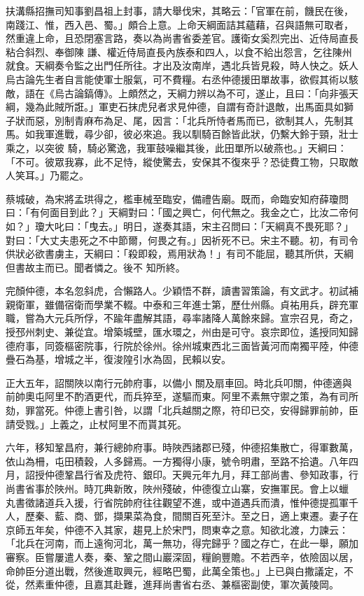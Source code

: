 \begin{pinyinscope}
 扶溝縣招撫司知事劉昌祖上封事，請大舉伐宋，其略云：「官軍在前，饑民在後，南踐江、惟，西入邑、蜀。」頗合上意。上命天綱面詰其蘊藉，召與語無可取者，然重違上命，且恐閉塞言路，奏以為尚書省委差官。護衛女奚烈完出、近侍局直長粘合斜烈、奉御陳
 謙、權近侍局直長內族泰和四人，以食不給出怨言，乞往陳州就食。天綱奏令監之出門任所往。才出及汝南岸，遇北兵皆見殺，時人快之。妖人烏古論先生者自言能使軍士服氣，可不費糧。右丞仲德援田單故事，欲假其術以駭敵，語在《烏古論鎬傳》。上頗然之，天綱力辨以為不可，遂止，且曰：「向非張天綱，幾為此賊所誑。」軍吏石抹虎兒者求見仲德，自謂有奇計退敵，出馬面具如獅子狀而惡，別制青麻布為足、尾，因言：「北兵所恃者馬而已，欲制其人，先制其馬。如我軍進戰，尋少卻，彼必來追。我以馴騎百餘皆此狀，仍繫大鈴于頸，壯士乘之，以突彼
 騎，騎必驚逸，我軍鼓噪繼其後，此田單所以破燕也。」天綱曰：「不可。彼眾我寡，此不足恃，縱使驚去，安保其不復來乎？恐徒費工物，只取敵人笑耳。」乃罷之。



 蔡城破，為宋將孟珙得之，檻車械至臨安，備禮告廟。既而，命臨安知府薛瓊問曰：「有何面目到此？」天綱對曰：「國之興亡，何代無之。我金之亡，比汝二帝何如？」瓊大叱曰：「曳去。」明日，遂奏其語，宋主召問曰：「天綱真不畏死耶？」對曰：「大丈夫患死之不中節爾，何畏之有。」因祈死不已。宋主不聽。初，有司令供狀必欲書虜主，天綱曰：「殺即殺，焉用狀為！」有司不能屈，聽其所供，天綱但書故主而已。聞者憐之。後不
 知所終。



 完顏仲德，本名忽斜虎，合懶路人。少穎悟不群，讀書習策論，有文武才。初試補親衛軍，雖備宿衛而學業不輟。中泰和三年進士第，歷仕州縣。貞祐用兵，辟充軍職，嘗為大元兵所俘，不踰年盡解其語，尋率諸降人萬餘來歸。宣宗召見，奇之，授邳州刺史、兼從宜。增築城壁，匯水環之，州由是可守。哀宗即位，遙授同知歸德府事，同簽樞密院事，行院於徐州。徐州城東西北三面皆黃河而南獨平陸，仲德疊石為基，增城之半，復浚隍引水為固，民賴以安。



 正大五年，詔關陜以南行元帥府事，以備小
 關及扇車回。時北兵叩關，仲德適與前帥奧屯阿里不酌酒更代，而兵猝至，遂驅而東。阿里不素無守禦之策，為有司所劾，罪當死。仲德上書引咎，以謂「北兵越關之際，符印已交，安得歸罪前帥，臣請受戮。」上義之，止杖阿里不而貰其死。



 六年，移知鞏昌府，兼行總帥府事。時陜西諸郡已殘，仲德招集散亡，得軍數萬，依山為柵，屯田積穀，人多歸焉。一方獨得小康，號令明肅，至路不拾遺。八年四月，詔授仲德鞏昌行省及虎符、銀印。天興元年九月，拜工部尚書、參知政事，行尚書省事於陜州。時兀典新敗，陜州殘破，仲德復立山寨，安撫軍民。會上以蠟
 丸書徵諸道兵入援，行省院帥府往往觀望不進，或中道遇兵而潰，惟仲德提孤軍千人，歷秦、藍、商、鄧，擷果菜為食，間關百死至汴。至之日，適上東遷。妻子在京師五年矣，仲德不入其家，趨見上於宋門，問東幸之意。知欲北渡，力諫云：「北兵在河南，而上遠徇河北，萬一無功，得完歸乎？國之存亡，在此一舉，願加審察。臣嘗屢遣人奏，秦、鞏之間山巖深固，糧餉豐贍。不若西辛，依險固以居，命帥臣分道出戰，然後進取興元，經略巴蜀，此萬全策也。」上已與白撒議定，不從，然素重仲德，且嘉其赴難，進拜尚書省右丞、兼樞密副使，軍次黃陵岡。




\end{pinyinscope}
